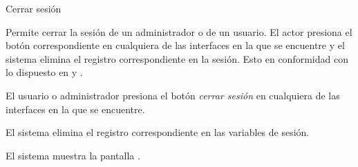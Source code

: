%
%

{Cerrar sesión}
{
  Permite cerrar la sesión de un administrador o de un usuario. El actor
  presiona el botón correspondiente en cualquiera de las interfaces en
  la que se encuentre y el sistema elimina el registro correspondiente
  en la sesión. Esto en conformidad con lo dispuesto en
   y
  .

  \begin{trayectoriaPrincipal}

    \item El usuario o administrador presiona el botón \textit{cerrar sesión}
      en cualquiera de las interfaces en la que se encuentre.

    \item El sistema elimina el registro correspondiente en las variables
      de sesión.

    \item El sistema muestra la pantalla
      .

  \end{trayectoriaPrincipal}
}
